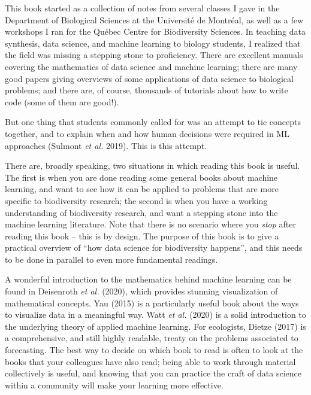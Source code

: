 \documentclass[
  letterpaper,
]{scrbook}
\begin{document}
This book started as a collection of notes from several classes I gave
in the Department of Biological Sciences at the Université de Montréal,
as well as a few workshops I ran for the Québec Centre for Biodiversity
Sciences. In teaching data synthesis, data science, and machine learning
to biology students, I realized that the field was missing a stepping
stone to proficiency. There are excellent manuals covering the
mathematics of data science and machine learning; there are many good
papers giving overviews of some applications of data science to
biological problems; and there are, of course, thousands of tutorials
about how to write code (some of them are good!).

But one thing that students commonly called for was an attempt to tie
concepts together, and to explain when and how human decisions were
required in ML approaches (Sulmont \emph{et al.} 2019). This is this
attempt.

There are, broadly speaking, two situations in which reading this book
is useful. The first is when you are done reading some general books
about machine learning, and want to see how it can be applied to
problems that are more specific to biodiversity research; the second is
when you have a working understanding of biodiversity research, and want
a stepping stone into the machine learning literature. Note that there
is no scenario where you \emph{stop} after reading this book -- this is
by design. The purpose of this book is to give a practical overview of
``how data science for biodiversity happens'', and this needs to be done
in parallel to even more fundamental readings.


A wonderful introduction to the mathematics behind machine learning can
be found in Deisenroth \emph{et al.} (2020), which provides stunning
visualization of mathematical concepts. Yau (2015) is a particularly
useful book about the ways to visualize data in a meaningful way. Watt
\emph{et al.} (2020) is a solid introduction to the underlying theory of
applied machine learning. For ecologists, Dietze (2017) is a
comprehensive, and still highly readable, treaty on the problems
associated to forecasting. The best way to decide on which book to read
is often to look at the books that your colleagues have also read; being
able to work through material collectively is useful, and knowing that
you can practice the craft of data science within a community will make
your learning more effective.
\end{document}
